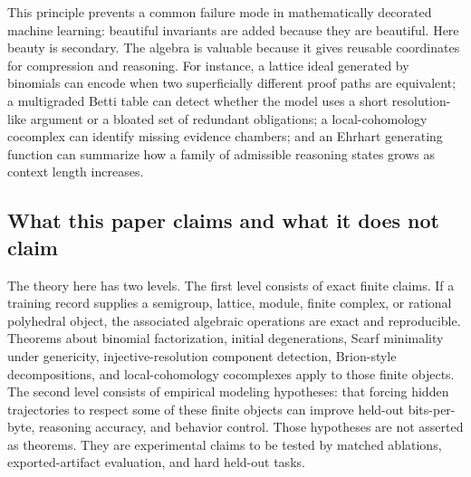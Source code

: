 \documentclass[11pt]{article}
\theoremstyle{definition}
\begin{document}
This principle prevents a common failure mode in mathematically decorated machine learning: beautiful invariants are added because they are beautiful.  Here beauty is secondary.  The algebra is valuable because it gives reusable coordinates for compression and reasoning.  For instance, a lattice ideal generated by binomials can encode when two superficially different proof paths are equivalent; a multigraded Betti table can detect whether the model uses a short resolution-like argument or a bloated set of redundant obligations; a local-cohomology cocomplex can identify missing evidence chambers; and an Ehrhart generating function can summarize how a family of admissible reasoning states grows as context length increases.

\subsection{What this paper claims and what it does not claim}
The theory here has two levels.  The first level consists of exact finite claims.  If a training record supplies a semigroup, lattice, module, finite complex, or rational polyhedral object, the associated algebraic operations are exact and reproducible.  Theorems about binomial factorization, initial degenerations, Scarf minimality under genericity, injective-resolution component detection, Brion-style decompositions, and local-cohomology cocomplexes apply to those finite objects.  The second level consists of empirical modeling hypotheses: that forcing hidden trajectories to respect some of these finite objects can improve held-out bits-per-byte, reasoning accuracy, and behavior control.  Those hypotheses are not asserted as theorems.  They are experimental claims to be tested by matched ablations, exported-artifact evaluation, and hard held-out tasks.
\end{document}

